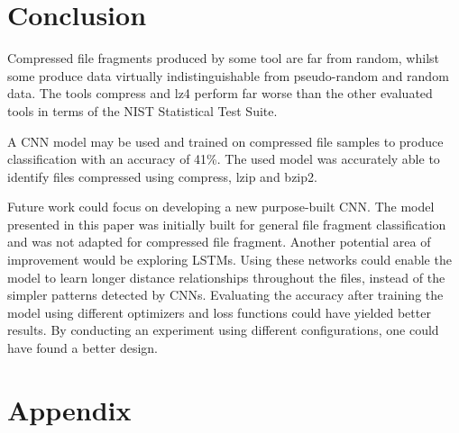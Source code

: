 \documentclass[conference]{IEEEtran}
\begin{document}
\newpage
\section{Conclusion}

Compressed file fragments produced by some tool are far from random, whilst some produce data virtually indistinguishable from pseudo-random and random data. The tools compress and lz4 perform far worse than the other evaluated tools in terms of the NIST Statistical Test Suite.

A CNN model may be used and trained on compressed file samples to produce classification with an accuracy of 41\%. The used model was accurately able to identify files compressed using compress, lzip and bzip2.

Future work could focus on developing a new purpose-built CNN. The model presented in this paper was initially built for general file fragment classification and was not adapted for compressed file fragment\cite{chen2018}. Another potential area of improvement would be exploring LSTMs. Using these networks could enable the model to learn longer distance relationships throughout the files, instead of the simpler patterns detected by CNNs\cite{LE2018S118}. Evaluating the accuracy after training the model using different optimizers and loss functions could have yielded better results. By conducting an experiment using different configurations, one could have found a better design.




\newpage
\onecolumn
\section*{Appendix}
\end{document}
